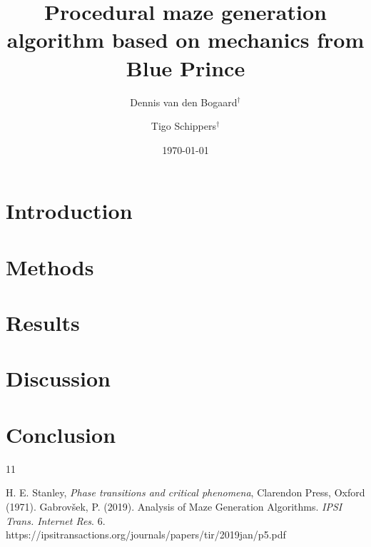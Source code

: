 \documentclass[12pt,nofootinbib,aps,amsmath,amssymb,preprint,showpacs]{revtex4}
\begin{document}
\title{Procedural maze generation algorithm based on mechanics from Blue Prince}
\author{Dennis van den Bogaard$^\dagger$}
\author{Tigo Schippers$^\dagger$}
 

\date{\today} 

\begin{abstract} 
\end{abstract}

\maketitle
 
\section{Introduction \label{sce1}}

\section{Methods\label{sec2}}

\section{Results \label{sec3}}

\section{Discussion \label{sec4}}

\section{Conclusion \label{sec5}}

\begin{thebibliography}{11}

\bibitem {} H. E. Stanley, {\it Phase transitions and critical
  phenomena}, Clarendon Press, Oxford (1971).
\bibitem {} Gabrovšek, P. (2019). Analysis of Maze Generation Algorithms. {\it IPSI Trans. Internet Res}. 6. https://ipsitransactions.org/journals/papers/tir/2019jan/p5.pdf 

\end{thebibliography}
\end{document}
